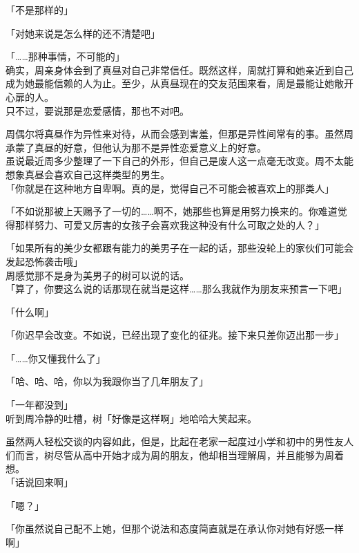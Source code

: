 「不是那样的」

「对她来说是怎么样的还不清楚吧」

「……那种事情，不可能的」\\

确实，周亲身体会到了真昼对自己非常信任。既然这样，周就打算和她亲近到自己成为她最能信赖的人为止。至少，从真昼现在的交友范围来看，周是最能让她敞开心扉的人。\\

只不过，要说那是恋爱感情，那也不对吧。

周偶尔将真昼作为异性来对待，从而会感到害羞，但那是异性间常有的事。虽然周承蒙了真昼的好意，但他认为那不是异性恋爱意义上的好意。\\

虽说最近周多少整理了一下自己的外形，但自己是废人这一点毫无改变。周不太能想象真昼会喜欢自己这样类型的男生。\\

「你就是在这种地方自卑啊。真的是，觉得自己不可能会被喜欢上的那类人」

「不如说那被上天赐予了一切的……啊不，她那些也算是用努力换来的。你难道觉得那样努力、可爱又厉害的女孩子会喜欢我这种没有什么可取之处的人？」

「如果所有的美少女都跟有能力的美男子在一起的话，那些没轮上的家伙们可能会发起恐怖袭击哦」\\

周感觉那不是身为美男子的树可以说的话。\\

「算了，你要这么说的话那现在就当是这样……那么我就作为朋友来预言一下吧」

「什么啊」

「你迟早会改变。不如说，已经出现了变化的征兆。接下来只差你迈出那一步」

「……你又懂我什么了」

「哈、哈、哈，你以为我跟你当了几年朋友了」

「一年都没到」\\

听到周冷静的吐槽，树「好像是这样啊」地哈哈大笑起来。

虽然两人轻松交谈的内容如此，但是，比起在老家一起度过小学和初中的男性友人们而言，树尽管从高中开始才成为周的朋友，他却相当理解周，并且能够为周着想。\\

「话说回来啊」

「嗯？」

「你虽然说自己配不上她，但那个说法和态度简直就是在承认你对她有好感一样啊」

